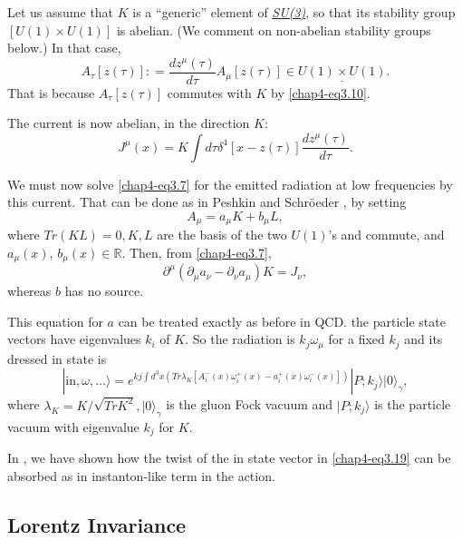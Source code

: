Let us assume that $K$ is a ``generic'' element of \ul{\textit{SU(3)}}, so that its stability group $[U(1) \times U (1)]$ is abelian. (We comment on non-abelian stability groups below.) In that case,
\begin{equation}
A_\tau [z(\tau)]: = \frac{dz^\mu(\tau)}{d\tau} A_\mu [z(\tau)] \in \underline{U(1) \times U(1)}.\label{chap4-eq3.15}
\end{equation}
That is because $A_\tau [z(\tau)]$ commutes with $K$ by \eqref{chap4-eq3.10}.

The current is now abelian, in the direction $K$:
\begin{equation}
J^\mu (x) = K \int d \tau \delta^4 [x-z(\tau)] \frac{dz^\mu(\tau)}{d\tau}. \label{chap4-eq3.16}
\end{equation}

We must now solve \eqref{chap4-eq3.7} for the emitted radiation at low frequencies by this current. That can be done as in Peshkin and Schr\"oeder \cite{chap4-key8}, by setting
\begin{equation}
A_\mu = a_\mu K + b_\mu L, \label{chap4-eq3.17}
\end{equation}
where $Tr (KL)=0, K, L$ are the basis of the two \ul{$U(1)$}'s and commute, and $a_\mu(x)$, $b_\mu(x)\in \mathbb{R}$. Then, from \eqref{chap4-eq3.7},
\begin{equation}
\partial^\mu (\partial_\mu a_{\nu} - \partial_\nu a_\mu) K = J_{\nu}, \label{chap4-eq3.18}
\end{equation}
whereas $b$ has no source.

This equation for $a$ can be treated exactly as before in QCD. the particle state vectors have eigenvalues $k_i$ of $K$. So the radiation is $k_j \omega_\mu$ for a fixed $k_j$ and its dressed in state is
\begin{equation}
|\text{in}, \omega, \ldots \rangle = e^{kj \int d^3 x (Tr\lambda_K[A_i^- (x) \omega_i^+ (x)- a_i^+ (x) \omega_i^-(x)])} | P; k_j \rangle |0\rangle_\gamma, \label{chap4-eq3.19} 
\end{equation}
where $\lambda_K = K / \sqrt{TrK^2}, |0\rangle_\gamma$ is the gluon Fock vacuum and $|P; k_j \rangle$ is the particle vacuum with eigenvalue $k_j$ for $K$.

In \cite{chap4-key4}, we have shown how the twist of the in state vector in \eqref{chap4-eq3.19} can be absorbed as in instanton-like term in the action.

\subsection{Lorentz Invariance}\label{chap4-sec3.2}

